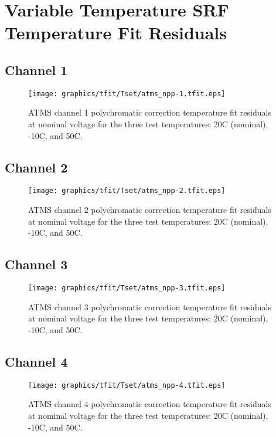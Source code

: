 \section{Variable Temperature SRF Temperature Fit Residuals}
\label{app:Tset_tfit_data_plots}

\subsection{Channel 1}
\begin{figure}[H]
  \label{fig:Tset.ch1_tfit}
  \centering
  \texttt{[image: graphics/tfit/Tset/atms\_npp-1.tfit.eps]}
  \caption{ATMS channel 1 polychromatic correction temperature fit residuals at nominal voltage for the three test temperatures: 20\textdegree{}C (nominal), -10\textdegree{}C, and 50\textdegree{}C.}
\end{figure}

\subsection{Channel 2}
\begin{figure}[H]
  \label{fig:Tset.ch2_tfit}
  \centering
  \texttt{[image: graphics/tfit/Tset/atms\_npp-2.tfit.eps]}
  \caption{ATMS channel 2 polychromatic correction temperature fit residuals at nominal voltage for the three test temperatures: 20\textdegree{}C (nominal), -10\textdegree{}C, and 50\textdegree{}C.}
\end{figure}

\subsection{Channel 3}
\begin{figure}[H]
  \label{fig:Tset.ch3_tfit}
  \centering
  \texttt{[image: graphics/tfit/Tset/atms\_npp-3.tfit.eps]}
  \caption{ATMS channel 3 polychromatic correction temperature fit residuals at nominal voltage for the three test temperatures: 20\textdegree{}C (nominal), -10\textdegree{}C, and 50\textdegree{}C.}
\end{figure}

\subsection{Channel 4}
\begin{figure}[H]
  \label{fig:Tset.ch4_tfit}
  \centering
  \texttt{[image: graphics/tfit/Tset/atms\_npp-4.tfit.eps]}
  \caption{ATMS channel 4 polychromatic correction temperature fit residuals at nominal voltage for the three test temperatures: 20\textdegree{}C (nominal), -10\textdegree{}C, and 50\textdegree{}C.}
\end{figure}

